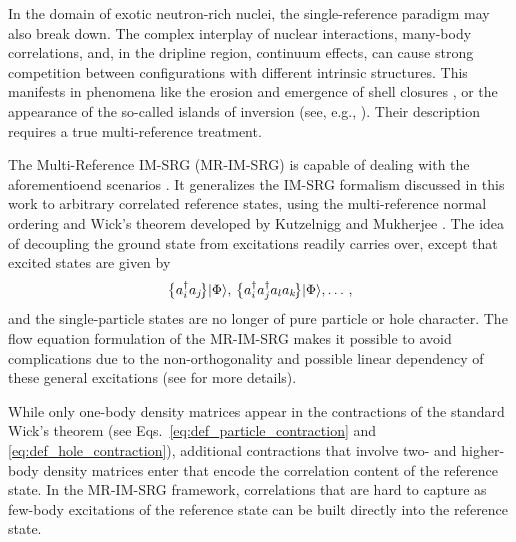 In the domain of exotic neutron-rich nuclei, the single-reference
paradigm may also break down. The complex interplay of nuclear
interactions, many-body correlations, and, in the dripline region,
continuum effects, can cause strong competition between configurations
with different intrinsic structures. This manifests in phenomena like
the erosion and emergence of shell closures
\cite{Wienholtz:2013bh,Holt:2014vn,Soma:2014eu,Hergert:2014vn}, or the
appearance of the so-called islands of inversion (see, e.g.,
\cite{Brown:2010xr}). Their description requires a true
multi-reference treatment.

The Multi-Reference IM-SRG (MR-IM-SRG) is capable of dealing with the
aforementioend scenarios
\cite{Hergert:2013ij,Hergert:2014vn,Hergert:2015qd}. It generalizes
the IM-SRG formalism discussed in this work to arbitrary correlated
reference states, using the multi-reference normal ordering and Wick's
theorem developed by Kutzelnigg and Mukherjee
\cite{Kutzelnigg:1997fk,Mukherjee:1997yg}. The idea of decoupling the
ground state from excitations readily carries over, except that
excited states are given by
\begin{equation*}
\big\{a^\dag_ia_j\!\big\}\!\,|{\Phi}\rangle,\,\big\{a^\dag_ia^\dag_ja_la_k\!\big\}\!\,|{\Phi}\rangle,\ldots\,,
\end{equation*}
and the single-particle states are no longer of pure particle or hole
character.  The flow equation formulation of the MR-IM-SRG makes it
possible to avoid complications due to the non-orthogonality and
possible linear dependency of these general excitations (see
\cite{Hergert:2015qd} for more details).

While only one-body density matrices appear in the contractions of the
standard Wick's theorem (see Eqs.~\eqref{eq:def_particle_contraction}
and \eqref{eq:def_hole_contraction}), additional contractions that
involve two- and higher-body density matrices enter that encode the
correlation content of the reference state. In the MR-IM-SRG
framework, correlations that are hard to capture as few-body
excitations of the reference state can be built directly into the
reference state.


